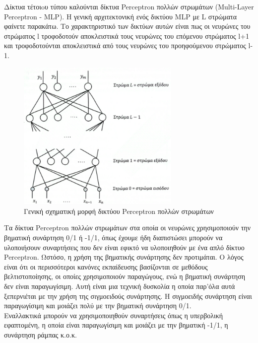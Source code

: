\documentclass[12pt]{article}
\numberwithin{equation}{section}
\begin{document}
Δίκτυα τέτοιoυ τύπου καλούνται δίκτυα Perceptron πολλών στρωμάτων (Multi-Layer Perceptron - MLP). Η γενική αρχιτεκτονική ενός δικτύου MLP με L στρώματα φαίνετε παρακάτω. Το χαρακτηριστικό των δικτύων αυτών είναι πως οι νευρώνες του στρώματος l τροφοδοτούν αποκλειστικά τους νευρώνες του επόμενου στρώματος l+1 και τροφοδοτούνται αποκλειστικά από τους νευρώνες του προηφούμενου στρώματος l-1. \\

\begin{figure}[h!]
  \centering
  \includegraphics[width=0.7\textwidth]{images/MLP.png} %
  \caption{Γενική σχηματική μορφή δικτύου Perceptron πολλών στρωμάτων}
  \label{figure 17}
\end{figure}

Τα δίκτυα Perceptron πολλών στρωμάτων στα οποία οι νευρώνες χρησιμοποιούν την βηματική συνάρτηση 0/1 ή -1/1, όπως έχουμε ήδη διαπιστώσει μπορούν να υλοποιήσουν συναρτήσεις που δεν είναι εφικτό να υλοποιηθούν με ένα απλό δίκτυο Perceptron. Ωστόσο, η χρήση της βηματικής συνάρτησης δεν προτιμάται. Ο λόγος είναι ότι οι περισσότεροι κανόνες εκπαίδευσης βασίζονται σε μεθόδους βελτιστοποίησης, οι οποίες χρησιμοποιούν παραγώγους, ενώ η βηματική συνάρτηση δεν είναι παραγωγίσιμη. Αυτή είναι μια τεχνική δυσκολία η οποία παρ'όλα αυτά ξεπερνιέται με την χρήση της σιγμοειδούς συνάρτησης. Η σιγμοειδής συνάρτηση είναι παραγωγίσιμη και μοιάζει πολύ με την βηματική συνάρτηση 0/1. \\

Εναλλακτικά μπορούν να χρησιμοποιηθούν συναρτήσεις όπως η υπερβολική εφαπτομένη, η οποία είναι παραγωγίσιμη και μοιάζει με την βηματική -1/1, η συνάρτηση ράμπας κ.ο.κ. \\
\end{document}
